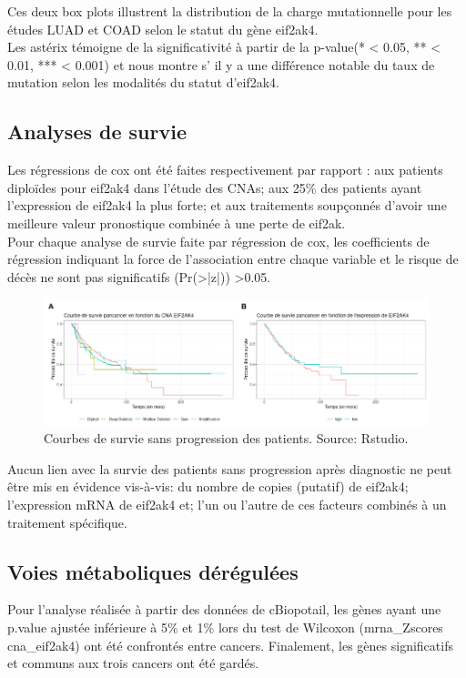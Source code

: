 \documentclass{style}
\begin{document}
Ces deux box plots illustrent la distribution de la charge mutationnelle pour les études LUAD et COAD selon le statut du gène eif2ak4. \\
Les astérix témoigne de la significativité à partir de la p-value(* < 0.05, ** < 0.01, *** < 0.001) et nous montre s' il y a une différence notable du taux de mutation selon les modalités du statut d’eif2ak4. \\

\subsection{Analyses de survie}
Les régressions de cox ont été faites respectivement par rapport : aux patients diploïdes pour eif2ak4 dans l’étude des CNAs; aux 25\% des patients ayant l’expression de eif2ak4 la plus forte; et aux traitements soupçonnés d’avoir une meilleure valeur pronostique combinée à une perte de eif2ak. \\
Pour chaque analyse de survie faite par régression de cox, les coefficients de régression indiquant la force de l’association entre chaque variable et le risque de décès ne sont pas significatifs (Pr(>|z|)) >0.05. \\
\begin{figure}[H]
  \centering
  \includegraphics[width=16cm]{images/figures/surv.png}
  \caption[Courbes de survie sans progression des patients.]{Courbes de survie sans progression des patients. Source: Rstudio.}
  \label{fig:surv}
\end{figure}

Aucun lien avec la survie des patients sans progression après diagnostic ne peut être mis en évidence vis-à-vis: du  nombre de copies (putatif) de eif2ak4; l’expression mRNA de eif2ak4 et; l’un ou l’autre de ces facteurs combinés à un traitement spécifique.

\subsection{Voies métaboliques dérégulées}
Pour l'analyse réalisée à partir des données de cBiopotail, les gènes ayant une p.value ajustée inférieure à 5\% et 1\% lors du test de Wilcoxon (mrna\_Zscores ~ cna\_eif2ak4) ont été confrontés entre cancers. Finalement, les gènes significatifs et communs aux trois cancers ont été gardés. \\
\end{document}
